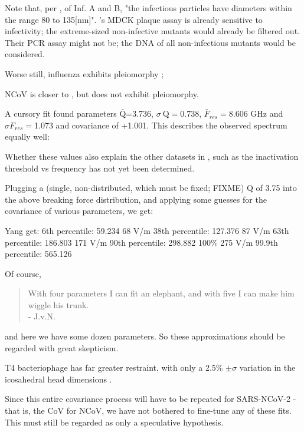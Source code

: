 \documentclass[paper.tex]{subfiles}
\begin{document}
Note that, per \cite{lauffer1944biophysical}, of Inf. A and B, "the infectious particles have diameters within the range 80 to 135[nm]". \cite{Efficient2015}'s MDCK plaque assay is already sensitive to infectivity; the extreme-sized non-infective mutants would already be filtered out. Their PCR assay might not be; the DNA of all non-infectious mutants would be considered.


Worse still, influenza exhibits pleiomorphy \cite{Influenza2006}; 



NCoV is closer to \cite{Viral2020}, but does not exhibit pleiomorphy.

A cursory fit found parameters $\bar{\text{Q}}$=3.736,  $\sigma \ \text{Q} = $0.738, $\bar{F}_{res}=$8.606 GHz and $\sigma {F_{res}}=$1.073 and covariance of +1.001. This describes the observed spectrum equally well:

Whether these values also explain the other datasets in \cite{Efficient2015}, such as the inactivation threshold vs frequency has not yet been determined.

Plugging a (single, non-distributed, which must be fixed; FIXME) Q of 3.75 into the above breaking force distribution, and applying some guesses for the covariance of various parameters, we get:

								Yang get:
6th percentile: 59.234       68 V/m
38th percentile: 127.376		87 V/m
63th percentile: 186.803		171 V/m
90th percentile: 298.882     100\% 275 V/m
99.9th percentile: 565.126 

Of course, 
\begin{quote}
	With four parameters I can fit an elephant, and with five I can make him wiggle his trunk. \\- J.v.N.
\end{quote}

and here we have some dozen parameters. So these approximations should be regarded with great skepticism.


T4 bacteriophage has far greater restraint, with only a 2.5\% $\pm \sigma$ variation in the icosahedral head dimensions \cite{Head1988}.\footnotemark


Since this entire covariance process will have to be repeated for SARS-NCoV-2 - that is, the CoV for NCoV, we have not bothered to fine-tune any of these fits. This must still be regarded as only a speculative hypothesis.
\end{document}
